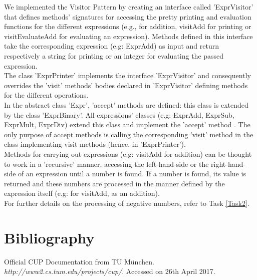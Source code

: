 \documentclass[paper=a4, fontsize=11pt]{scrartcl}
\numberwithin{equation}{section}		%
\numberwithin{figure}{section}			%
\numberwithin{table}{section}				%
\begin{document}
We implemented the Visitor Pattern by creating an interface called 'ExprVisitor' that defines methods' signatures for accessing the pretty printing and evaluation functions for the different expressions (e.g., for addition, visitAdd for printing or visitEvaluateAdd for evaluating an expression). Methods defined in this interface take the corresponding expression (e.g: ExprAdd) as input and return respectively a string for printing or an integer for evaluating the passed expression.  \\
The class 'ExprPrinter' implements the interface 'ExprVisitor' and consequently overrides the 'visit' methods' bodies declared in 'ExprVisitor' defining methods for the different operations. \\
In the abstract class 'Expr', 'accept' methods are defined: this class is extended by the class 'ExprBinary'. All expressions' classes (e.g: ExprAdd, ExprSub, ExprMult, ExprDiv) extend this class and implement the 'accept' method . The only purpose of accept methods is calling the corresponding 'visit' method in the class implementing visit methods (hence, in 'ExprPrinter'). \\
Methods for carrying out expressions (e.g: visitAdd for addition) can be thought to work in a 'recursive' manner, accessing the left-hand-side or the right-hand-side of an expression until a number is found. If a number is found, its value is returned and these numbers are processed in the manner defined by the expression itself (e.g: for visitAdd, as an addition). \\
For further details on the processing of negative numbers, refer to Task \ref{Task2}.


 
\section{Bibliography}
\begin{thebibliography}{9}%
Official CUP Documentation from TU M\"unchen. \textit{http://www2.cs.tum.edu/projects/cup/}. Accessed on 26th April 2017.
\end{thebibliography}
\end{document}
